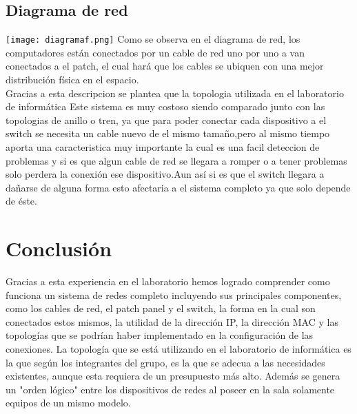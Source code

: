 \documentclass{udpreport}
\begin{document}
	\section{Diagrama de red}
		\texttt{[image: diagramaf.png]}
		Como se observa en el diagrama de red, los computadores están conectados por un cable de red uno por uno 
		a van conectados a el patch, el cual hará que los cables se ubiquen con una mejor distribución física 
		en el espacio.\\
		Gracias a esta descripcion se plantea que la topologia utilizada en el laboratorio de informática
		Este sistema es muy costoso siendo comparado junto con las topologias de anillo o tren, ya que para poder
		conectar cada dispositivo a el switch se necesita un cable nuevo de el mismo tamaño,pero al mismo tiempo
		aporta una caracteristica muy importante la cual es una facil deteccion de problemas y si es que algun
		cable de red se llegara a romper o a tener problemas solo perdera la conexión  ese dispositivo.Aun así 
		si es que el switch llegara a dañarse de alguna forma esto afectaria a el sistema completo ya que solo
		depende de éste.
\chapter{Conclusión}
                Gracias a esta experiencia en el laboratorio hemos logrado comprender como funciona un sistema de redes completo 
                incluyendo sus principales componentes, como los cables de red, el patch panel y el switch, la forma en la cual son 
                conectados estos mismos, la utilidad de la dirección IP, la dirección MAC y las topologías que se podrían haber 
                implementado en la configuración de las conexiones. La topología que se está utilizando en el laboratorio de 
                informática es la que según los integrantes del grupo, es la que se adecua a las necesidades existentes, aunque esta 
                requiera de un presupuesto más alto. Además se genera un "orden lógico" entre los dispositivos de redes al poseer en 
                la sala solamente equipos de un mismo modelo.
\end{document}
